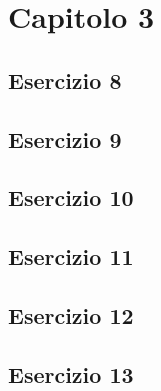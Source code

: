 \section{\textbf{Capitolo 3}}
\subsection{Esercizio 8}

\newpage
\subsection{Esercizio 9}

\newpage
\subsection{Esercizio 10}

\newpage
\subsection{Esercizio 11}

\newpage
\subsection{Esercizio 12}

\newpage
\subsection{Esercizio 13}

\newpage
